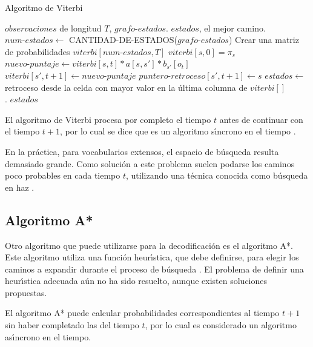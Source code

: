 \begin{algorithm}[H]
\caption{Algoritmo de Viterbi} \label{viterbi}
\begin{algorithmic}[1]
\REQUIRE $observaciones$ de longitud $T$, $grafo\mbox{-}estados$.
\ENSURE $estados$, el mejor camino.
\STATE $num\mbox{-}estados \leftarrow$ CANTIDAD-DE-ESTADOS($grafo\mbox{-}estados$) 
\STATE Crear una matriz de probabilidades $viterbi[num\mbox{-}estados, T]$
	\STATE $viterbi[s,0] = \pi_s$
\ENDFOR
{}
		\STATE $nuevo\mbox{-}puntaje \leftarrow viterbi[s,t] * a[s,s'] * b_{s'}[o_t]$
			\STATE $viterbi[s',t+1] \leftarrow nuevo\mbox{-}puntaje$
			\STATE $puntero\mbox{-}retroceso[s',t+1] \leftarrow s$
		\ENDIF  
		\ENDFOR
	\ENDFOR
\ENDFOR
\STATE $estados \leftarrow$ retroceso desde la celda con mayor valor en la \'ultima columna de $viterbi[]$
\\ .
\RETURN $estados$
\end{algorithmic}
\end{algorithm}

El algoritmo de Viterbi procesa por completo el tiempo $t$ antes de continuar con el tiempo $t + 1$, por
lo cual se dice que es un algoritmo s{\'\i}ncrono en el tiempo \cite{huang-handbook10}.

En la pr\'actica, para vocabularios extensos, el espacio de b\'usqueda resulta demasiado grande.
Como soluci\'on a este problema suelen podarse los caminos poco probables en cada tiempo $t$,
utilizando una t\'ecnica conocida como b\'usqueda en haz \cite{Jurafsky}.

\subsection{Algoritmo A*}

Otro algoritmo que puede utilizarse para la decodificaci\'on es el algoritmo A*. Este algoritmo
utiliza una funci\'on heur{\'\i}stica, que debe definirse, para elegir los caminos a expandir
durante el proceso de b\'usqueda \cite{Russell2003Solving}. 
El problema de definir una heur{\'\i}stica adecuada a\'un no ha sido resuelto, aunque existen soluciones propuestas.

El algoritmo A* puede calcular probabilidades correspondientes al tiempo $t + 1$ sin haber completado 
las del tiempo $t$, por lo cual es considerado un algoritmo as{\'\i}ncrono en el tiempo.

